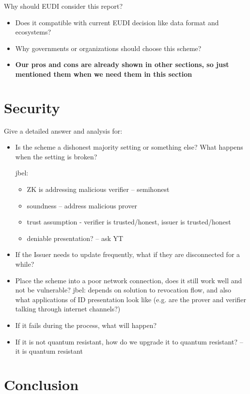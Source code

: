 \documentclass{iacrtrans}
\newcommand{\jbel}[1]{{\color{blue}{}jbel: #1}}
\begin{document}
Why should EUDI consider this report?
\begin{itemize}
    \item Does it compatible with current EUDI decision like data format and ecosystems?
    \item Why governments or organizations should choose this scheme?
    \item \textbf{Our pros and cons are already shown in other sections, so just mentioned them when we need them in this section}
\end{itemize}

\section{Security}
\label{sec:security}

Give a detailed answer and analysis for:
\begin{itemize}
    \item Is the scheme a dishonest majority setting or something else? What happens when the setting is broken?
    \jbel{\begin{itemize}
        \item ZK is addressing malicious verifier -- semihonest 
        \item soundness -- address malicious prover
        \item trust assumption - verifier is trusted/honest, issuer is trusted/honest
        \item deniable presentation? -- ask YT
    \end{itemize}}
        
    \item If the Issuer needs to update frequently, what if they are disconnected for a while? 
    \item Place the scheme into a poor network connection, does it still work well and not be vulnerable?
    \jbel{depends on solution to revocation flow, and also what applications of ID presentation look like (e.g. are the prover and verifier talking through internet channels?)}
	\item If it fails during the process, what will happen?
	\item If it is not quantum resistant, how do we upgrade it to quantum resistant? -- it is quantum resistant
\end{itemize}


\section{Conclusion}
\label{sec:conclusion}
\end{document}
